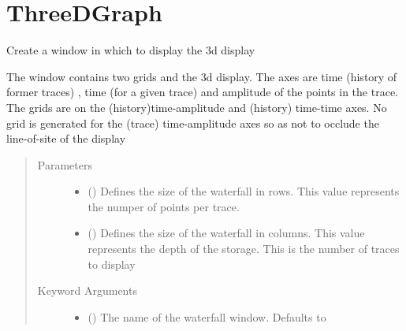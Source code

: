 \documentclass[letterpaper,10pt,english]{sphinxmanual}
\begin{document}
\section{ThreeDGraph}
\label{\detokenize{index:module-ThreeDGraph}}\label{\detokenize{index:threedgraph}}

\begin{fulllineitems}
\label{\detokenize{index:ThreeDGraph.Graph}}
Create a window in which to display the 3d display

The window contains two grids and the 3d display.  The axes are
time (history of former traces) , time (for a given trace) and
amplitude of the points in the trace.  The grids are on the
(history)time-amplitude and (history) time-time axes.  No grid is
generated for the (trace) time-amplitude axes so as not to occlude
the line-of-site of the display
\begin{quote}\begin{description}
\item[{Parameters}] \leavevmode\begin{itemize}
\item {} 
 () \textendash{} Defines the size of the waterfall in rows.  This
value represents the numper of points per trace.

\item {} 
 () \textendash{} Defines the size of the waterfall in columns.  This
value represents the depth of the storage.  This
is the number of traces to display

\end{itemize}

\item[{Keyword Arguments}] \leavevmode\begin{itemize}
\item {} 
 () \textendash{} The name of the waterfall window.  Defaults to


\end{itemize}
\end{description}
\end{quote}
\end{fulllineitems}
\end{document}
